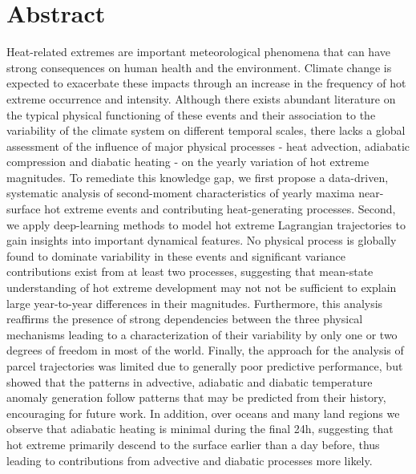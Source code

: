 \chapter*{Abstract}

Heat-related extremes are important meteorological phenomena that can have strong consequences on human health and the environment. Climate change is expected to exacerbate these impacts through an increase in the frequency of hot extreme occurrence and intensity. Although there exists abundant literature on the typical physical functioning of these events and their association to the variability of the climate system on different temporal scales, there lacks a global assessment of the influence of major physical processes - heat advection, adiabatic compression and diabatic heating - on the yearly variation of hot extreme magnitudes. To remediate this knowledge gap, we first propose a data-driven, systematic analysis of second-moment characteristics of yearly maxima near-surface hot extreme events and contributing heat-generating processes. Second, we apply deep-learning methods to model hot extreme Lagrangian trajectories to gain insights into important dynamical features. No physical process is globally found to dominate variability in these events and significant variance contributions exist from at least two processes, suggesting that mean-state understanding of hot extreme development may not not be sufficient to explain large year-to-year differences in their magnitudes. Furthermore, this analysis reaffirms the presence of strong dependencies between the three physical mechanisms leading to a characterization of their variability by only one or two degrees of freedom in most of the world. Finally, the approach for the analysis of parcel trajectories was limited due to generally poor predictive performance, but showed that the patterns in advective, adiabatic and diabatic temperature anomaly generation follow patterns that may be predicted from their history, encouraging for future work. In addition, over oceans and many land regions we observe that adiabatic heating is minimal during the final 24h, suggesting that hot extreme primarily descend to the surface earlier than a day before, thus leading to contributions from advective and diabatic processes more likely.

